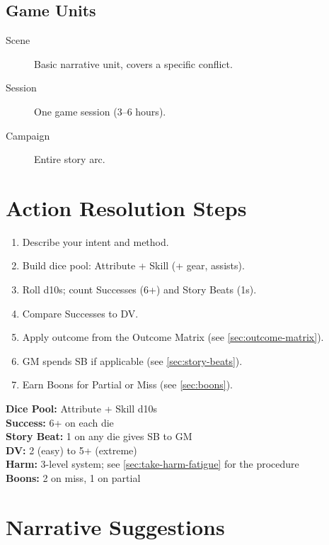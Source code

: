 \subsection{Game Units}
\begin{description}
  \item[Scene] Basic narrative unit, covers a specific conflict.
  \item[Session] One game session (3–6 hours).
  \item[Campaign] Entire story arc.
\end{description}

\section{Action Resolution Steps}
\label{sec:action-resolution}

\begin{enumerate}
  \item Describe your intent and method.
  \item Build dice pool: Attribute + Skill (+ gear, assists).
  \item Roll d10s; count Successes (6+) and Story Beats (1s).
  \item Compare Successes to DV.
  \item Apply outcome from the Outcome Matrix (see \ref{sec:outcome-matrix}).
  \item GM spends SB if applicable (see \ref{sec:story-beats}).
  \item Earn Boons for Partial or Miss (see \ref{sec:boons}).
\end{enumerate}

\begin{tcolorbox}[colback=blue!5!white,colframe=blue!75!black,title=Quick Reference,fonttitle=\bfseries]
\textbf{Dice Pool:} Attribute + Skill d10s \\
\textbf{Success:} 6+ on each die \\
\textbf{Story Beat:} 1 on any die gives SB to GM \\
\textbf{DV:} 2 (easy) to 5+ (extreme) \\
\textbf{Harm:} 3-level system; see \ref{sec:take-harm-fatigue} for the procedure \\
\textbf{Boons:} 2 on miss, 1 on partial
\end{tcolorbox}

\section{Narrative Suggestions}
\label{sec:narrative-suggestions}

